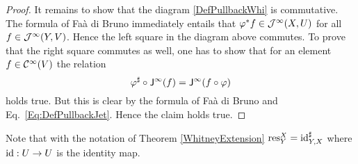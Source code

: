 \begin{proof}
It remains to show that the diagram \eqref{DefPullbackWhi} is commutative.
  The formula of Fa\`a di Bruno immediately entails that 
  $\varphi^* f \in \mathcal{J}^\infty (X,U)$ for all $f\in \mathcal{J}^\infty (Y,V)$. 
  Hence the left square  in the diagram above commutes. To prove that
  the right square commutes as well, one has to show that for an element 
  $f \in \mathcal{C}^\infty (V)$ the relation
  \begin{equation}
  \label{Eq:CommPol} 
     \varphi^{\sharp} \circ \mathsf{J}^\infty (f)  = \mathsf{J}^\infty ( f\circ \varphi ) 
  \end{equation}
  holds true. But this is clear by the formula of Fa\`a di Bruno 
  and Eq.~\eqref{Eq:DefPullbackJet}.
  Hence the claim holds true. 
\end{proof}
\begin{remark}
Note that with the notation of Theorem \ref{WhitneyExtension} $\operatorname{res}^X_Y=\operatorname{id}^{\sharp}_{Y,X}$ where $\operatorname{id}:U\to U$ is the identity map.
\end{remark}

